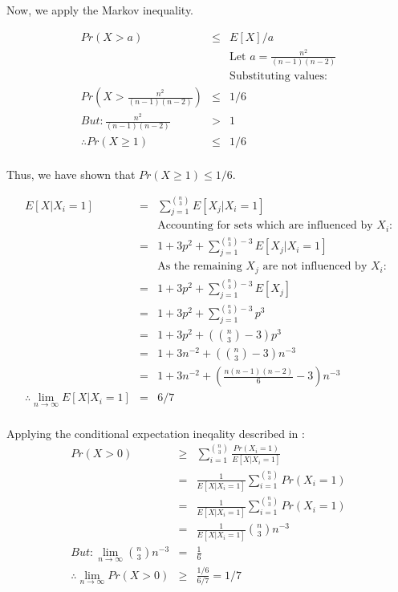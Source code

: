 \documentclass[10pt]{article}
\begin{document}
Now, we apply the Markov inequality.

\begin{eqnarray}
Pr(X>a) &\leq& E[X]/a\\
&&\text{Let $a = \frac{n^{2}}{(n-1)(n-2)}$}\\
&&\text{Substituting values:}\\
Pr(X > \frac{n^{2}}{(n-1)(n-2)}) &\leq& 1/6\\
But: \frac{n^{2}}{(n-1)(n-2)} &>& 1\\
\therefore Pr(X \geq 1) &\leq& 1/6\\
\end{eqnarray}

Thus, we have shown that $Pr(X\geq 1)\leq 1/6$.


\begin{eqnarray}
E[X|X_{i}=1] &=& \sum_{j=1}^{\binom{n}{3}} E[X_{j}|X_{i}=1]\\
&&\text{Accounting for sets which are influenced by $X_{i}$:}\\
&=& 1+3p^{2}+\sum_{j=1}^{\binom{n}{3}-3} E[X_{j}|X_{i}=1]\\
&&\text{As the remaining $X_{j}$ are not influenced by $X_{i}$:}\\
&=& 1+3p^{2}+\sum_{j=1}^{\binom{n}{3}-3} E[X_{j}]\\
&=& 1+3p^{2}+\sum_{j=1}^{\binom{n}{3}-3} p^{3}\\
&=& 1+3p^{2}+(\binom{n}{3}-3) p^{3}\\
&=& 1+3n^{-2}+(\binom{n}{3}-3) n^{-3}\\
&=& 1+3n^{-2}+(\frac{n(n-1)(n-2)}{6}-3) n^{-3}\\
\therefore \lim \limits_{n \to \infty } E[X|X_{i}=1] &=& 6/7\\
\end{eqnarray}

Applying the conditional expectation ineqality described in \cite{mitzenmacherUpfal}:
\begin{eqnarray}
Pr(X>0) &\geq& \sum_{i=1}^{\binom{n}{3}} \frac{Pr(X_{i}=1)}{E[X|X_{i}=1]}\\
&=& \frac{1}{E[X|X_{i}=1]}\sum_{i=1}^{\binom{n}{3}} Pr(X_{i}=1)\\
&=& \frac{1}{E[X|X_{i}=1]}\sum_{i=1}^{\binom{n}{3}} Pr(X_{i}=1)\\
&=& \frac{1}{E[X|X_{i}=1]} \binom{n}{3} n^{-3}\\
But: \lim \limits_{n \to \infty } \binom{n}{3} n^{-3}&=& \frac{1}{6}\\
\therefore \lim \limits_{n \to \infty } Pr(X>0) &\geq& \frac{1/6}{6/7} = 1/7\\
\end{eqnarray}
\end{document}

